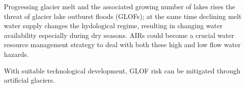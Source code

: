 Progressing glacier melt and the associated growing number of lakes rises the threat of glacier lake outburst
floods (GLOFs); at the same time declining melt water supply changes the hydological regime, resulting in
changing water availability especially during dry seasons. AIRs could become a crucial water resource management
strategy to deal with both these high and low flow water hazards.

With suitable technological development, GLOF risk can be mitigated through artificial glaciers.








